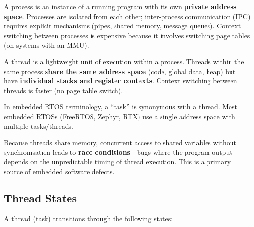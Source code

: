 \begin{definition}[Process]
A process is an instance of a running program with its own \textbf{private address space}. Processes are isolated from each other; inter-process communication (IPC) requires explicit mechanisms (pipes, shared memory, message queues). Context switching between processes is expensive because it involves switching page tables (on systems with an MMU).
\end{definition}

\begin{definition}[Thread]
A thread is a lightweight unit of execution within a process. Threads within the same process \textbf{share the same address space} (code, global data, heap) but have \textbf{individual stacks and register contexts}. Context switching between threads is faster (no page table switch).
\end{definition}

In embedded RTOS terminology, a ``task'' is synonymous with a thread. Most embedded RTOSs (FreeRTOS, Zephyr, RTX) use a single address space with multiple tasks/threads.

\begin{important}
Because threads share memory, concurrent access to shared variables without synchronisation leads to \textbf{race conditions}---bugs where the program output depends on the unpredictable timing of thread execution. This is a primary source of embedded software defects.
\end{important}

\subsection{Thread States}

A thread (task) transitions through the following states:

